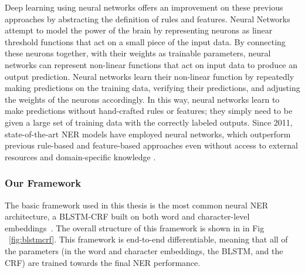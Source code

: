 Deep learning using neural networks offers an improvement on these previous approaches by abstracting the definition of rules and features. Neural Networks attempt to model the power of the brain by representing neurons as linear threshold functions that act on a small piece of the input data. By connecting these neurons together, with their weights as trainable parameters, neural networks can represent non-linear functions that act on input data to produce an output prediction. Neural networks learn their non-linear function by repeatedly making predictions on the training data, verifying their predictions, and adjusting the weights of the neurons accordingly. In this way, neural networks learn to make predictions without hand-crafted rules or features; they simply need to be given a large set of training data with the correctly labeled outputs. Since 2011, state-of-the-art NER models have employed neural networks, which outperform previous rule-based and feature-based approaches even without access to external resources and domain-specific knowledge \citep{NeuralNERSurvey}.

\subsubsection{Our Framework}
\label{sec:ourframework}
The basic framework used in this thesis is the most common neural NER architecture, a BLSTM-CRF built on both word and character-level embeddings~\citep{DBLP:conf/acl/MaH16}. The overall structure of this framework is shown in in Fig ~\ref{fig:blstmcrf}. This framework is end-to-end differentiable, meaning that all of the parameters (in the word and character embeddings, the BLSTM, and the CRF) are trained towards the final NER performance.

